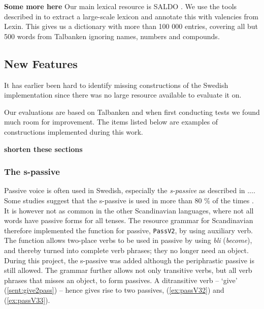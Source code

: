 \documentclass[runningheads,a4paper]{llncs}
\begin{document}
%
\textbf{Some more here}
Our main lexical resource is SALDO \cite{saldo}. We use the tools
described in \cite{ahlbergEnache} to extract a large-scale lexicon and annotate
this with valencies from Lexin. This gives us a dictionary with more than 
100 000 entries, covering all but 500 words from Talbanken ignoring names,
numbers and compounds.

\subsection{New Features}

%
%
%
%
%
It has earlier been hard to identify missing constructions of the Swedish
implementation since there was no large resource available to evaluate it on.

Our evaluations are based on Talbanken and when first conducting tests
 we found much room for improvement. The items listed below are examples
 of constructions implemented during this work.

\textbf{shorten these sections}
\subsubsection{The s-passive}
Passive voice is often used in Swedish, especially the
\textit{s-passive} as described in ....
Some studies suggest that the s-passive is used in more than 80 \% of the times
\cite{laanemets}.
It is however not as common in the other Scandinavian languages, 
where not all words have passive forms for all tenses. The resource grammar for
Scandinavian therefore implemented the function for passive,
\verb-PassV2-, by using auxiliary verb.
The function allows two-place verbs to be used in passive by using \emph{bli} (\emph{become}), and thereby
turned into complete verb phrases; they no longer need an object.
During this project, the s-passive was added although the
periphrastic passive is still allowed.
The grammar further allows not only transitive verbs, but all verb phrases that
misses an object, to form passives.
A ditransitive verb -- `give' (\ref{sent:give2pass}) -- hence gives rise to two
passives, (\ref{ex:passV32}) and (\ref{ex:passV33}).
\label{sent:give2pass}
\label{ex:passV33}
\label{ex:passV32}
\end{document}
